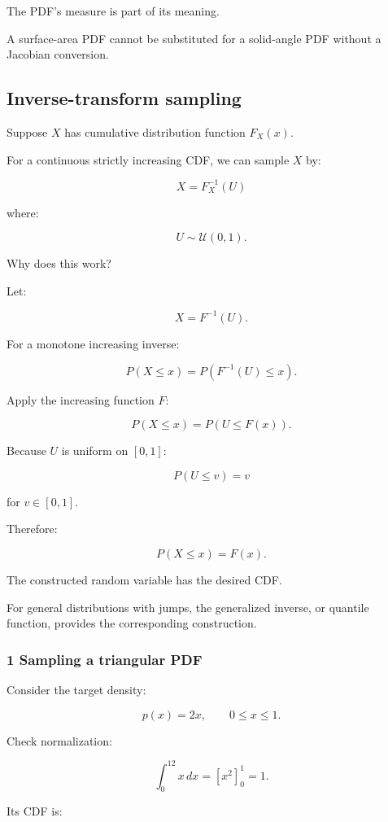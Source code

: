 The PDF's measure is part of its meaning.

A surface-area PDF cannot be substituted for a solid-angle PDF without a Jacobian conversion.

\subsection{Inverse-transform sampling}\label{02-foundations-ii-ch029-inverse-transform-sampling}

Suppose \(X\) has cumulative distribution function \(F_X(x)\).

For a continuous strictly increasing CDF, we can sample \(X\) by:

\[
 \boxed{X=F_X^{-1}(U)}
\]

where:

\[
 U\sim\mathcal U(0,1).
\]

Why does this work?

Let:

\[
 X=F^{-1}(U).
\]

For a monotone increasing inverse:

\[
 P(X\le x) = P(F^{-1}(U)\le x).
\]

Apply the increasing function \(F\):

\[
 P(X\le x)=P(U\le F(x)).
\]

Because \(U\) is uniform on \([0,1]\):

\[
 P(U\le v)=v
\]

for \(v\in[0,1]\).

Therefore:

\[
 \boxed{P(X\le x)=F(x)}.
\]

The constructed random variable has the desired CDF.

For general distributions with jumps, the generalized inverse, or quantile function, provides the corresponding construction.

\subsubsection{1 Sampling a triangular PDF}\label{02-foundations-ii-ch029-sampling-a-triangular-pdf}

Consider the target density:

\[
 p(x)=2x,\qquad0\le x\le1.
\]

Check normalization:

\[
 \int_0^12x\,dx = [x^2]_0^1=1.
\]

Its CDF is:

